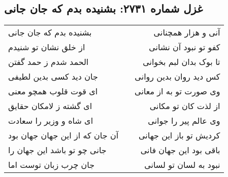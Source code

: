 \begin{center}
\section*{غزل شماره ۲۷۳۱: بشنیده بدم که جان جانی}
\label{sec:2731}
\begin{longtable}{l p{0.5cm} r}
بشنیده بدم که جان جانی
&&
آنی و هزار همچنانی
\\
از خلق نشان تو شنیدم
&&
کفو تو نبود آن نشانی
\\
الحمد شدم ز حمد گفتن
&&
تا بوک بدان لبم بخوانی
\\
جان دید کسی بدین لطیفی
&&
کس دید روان بدین روانی
\\
ای قوت قلوب همچو معنی
&&
وی صورت تو به از معانی
\\
ای گشته ز لامکان حقایق
&&
از لذت کان تو مکانی
\\
ای شاه و وزیر را سعادت
&&
وی عالم پیر را جوانی
\\
آن جان که از این جهان جهان بود
&&
کردیش تو باز این جهانی
\\
جانی چو تو باشد این جهان را
&&
باقی بود این جهان فانی
\\
جان چرب زبان توست اما
&&
نبود به لسان تو لسانی
\\
\end{longtable}
\end{center}
